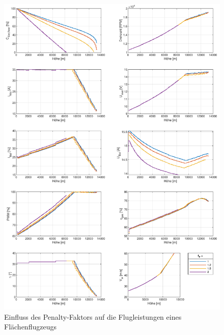 \begin{figure}[H]
\centering
	\includegraphics[scale=0.7]{Diagramme/Flaechenflzg_fp.pdf}
	\caption{Einfluss des Penalty-Faktors auf die Flugleistungen eines Flächenflugzeugs}
	\label{abb:fp}
\end{figure}



